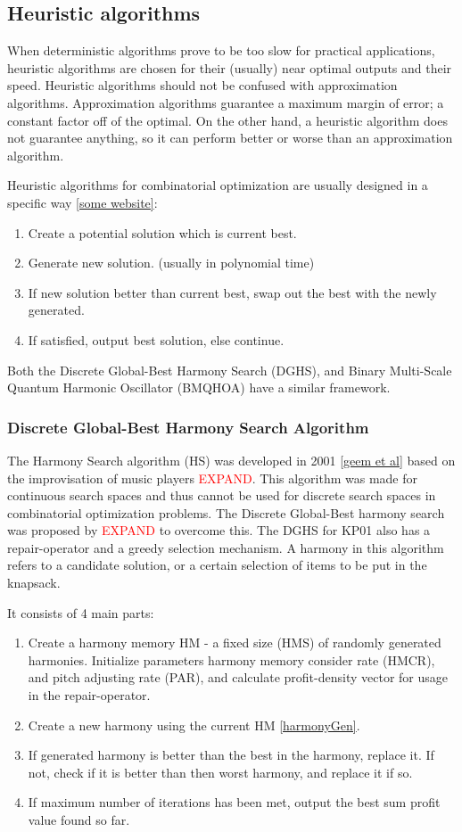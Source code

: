 \documentclass[titlepage]{article}
\begin{document}
\subsection*{Heuristic algorithms}
When deterministic algorithms prove to be too slow for practical applications, heuristic algorithms are chosen for their (usually) near optimal outputs and their speed. Heuristic algorithms should not be confused with approximation algorithms. Approximation algorithms guarantee a maximum margin of error; a constant factor off of the optimal. On the other hand, a heuristic algorithm does not guarantee anything, so it can perform better or worse than an approximation algorithm. 

Heuristic algorithms for combinatorial optimization are usually designed in a specific way \ref{some website}:
\begin{enumerate}
    \item Create a potential solution which is current best.
    \item Generate new solution. (usually in polynomial time) 
    \item If new solution better than current best, swap out the best with the newly generated. 
    \item If satisfied, output best solution, else continue.
\end{enumerate}

Both the Discrete Global-Best Harmony Search (DGHS), and Binary Multi-Scale Quantum Harmonic Oscillator (BMQHOA) have a similar framework.

\subsubsection{Discrete Global-Best Harmony Search Algorithm}
The Harmony Search algorithm (HS) was developed in 2001 \ref{geem et al} based on the improvisation of music players \textcolor{red}{EXPAND}. This algorithm was made for continuous search spaces and thus cannot be used for discrete search spaces in combinatorial optimization problems. The Discrete Global-Best harmony search was proposed by \textcolor{red}{EXPAND} to overcome this. The DGHS for KP01 also has a repair-operator and a greedy selection mechanism. A harmony in this algorithm refers to a candidate solution, or a certain selection of items to be put in the knapsack. 

It consists of 4 main parts:
\begin{enumerate}
    \item Create a harmony memory HM - a fixed size (HMS) of randomly generated harmonies. Initialize parameters harmony memory consider rate (HMCR), and pitch adjusting rate (PAR), and calculate profit-density vector for usage in the repair-operator.
    \item Create a new harmony using the current HM \ref{harmonyGen}.
    \item If generated harmony is better than the best in the harmony, replace it. If not, check if it is better than then worst harmony, and replace it if so. 
    \item If maximum number of iterations has been met, output the best sum profit value found so far.
\end{enumerate}
\end{document}
